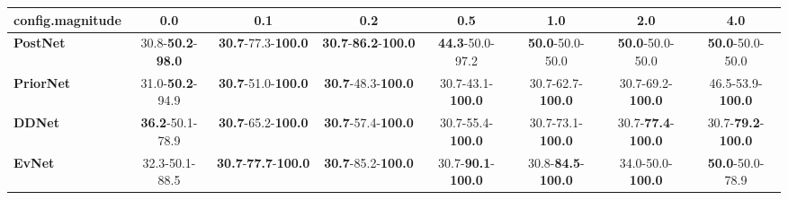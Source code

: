\begin{tabular}{lccccccc}
\toprule
\textbf{config.magnitude} &                               0.0 &                                         0.1 &                                         0.2 &                                0.5 &                                1.0 &                                2.0 &                                4.0 \\
\midrule
\textbf{PostNet } &  30.8-\textbf{50.2}-\textbf{98.0} &           \textbf{30.7}-77.3-\textbf{100.0} &  \textbf{30.7}-\textbf{86.2}-\textbf{100.0} &            \textbf{44.3}-50.0-97.2 &            \textbf{50.0}-50.0-50.0 &            \textbf{50.0}-50.0-50.0 &            \textbf{50.0}-50.0-50.0 \\
\textbf{PriorNet} &           31.0-\textbf{50.2}-94.9 &           \textbf{30.7}-51.0-\textbf{100.0} &           \textbf{30.7}-48.3-\textbf{100.0} &           30.7-43.1-\textbf{100.0} &           30.7-62.7-\textbf{100.0} &           30.7-69.2-\textbf{100.0} &           46.5-53.9-\textbf{100.0} \\
\textbf{DDNet   } &           \textbf{36.2}-50.1-78.9 &           \textbf{30.7}-65.2-\textbf{100.0} &           \textbf{30.7}-57.4-\textbf{100.0} &           30.7-55.4-\textbf{100.0} &           30.7-73.1-\textbf{100.0} &  30.7-\textbf{77.4}-\textbf{100.0} &  30.7-\textbf{79.2}-\textbf{100.0} \\
\textbf{EvNet   } &                    32.3-50.1-88.5 &  \textbf{30.7}-\textbf{77.7}-\textbf{100.0} &           \textbf{30.7}-85.2-\textbf{100.0} &  30.7-\textbf{90.1}-\textbf{100.0} &  30.8-\textbf{84.5}-\textbf{100.0} &           34.0-50.0-\textbf{100.0} &            \textbf{50.0}-50.0-78.9 \\
\bottomrule
\end{tabular}
